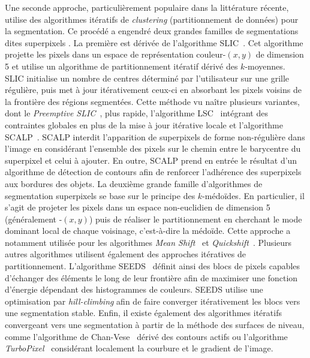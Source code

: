 Une seconde approche, particulièrement populaire dans la littérature récente, utilise des algorithmes itératifs de \emph{clustering} (partitionnement de données) pour la segmentation. Ce procédé a engendré deux grandes familles de segmentations dites \og superpixels \fg. La première est dérivée de l'algorithme \gls{SLIC}~\cite{achanta_slic_2010}. Cet algorithme projette les pixels dans un espace de représentation couleur-$(x,y)$ de dimension 5 et utilise un algorithme de partitionnement itératif dérivé des $k$-moyennes. \gls{SLIC} initialise un nombre de centres déterminé par l'utilisateur sur une grille régulière, puis met à jour itérativement ceux-ci en absorbant les pixels voisins de la frontière des régions segmentées. Cette méthode vu naître plusieurs variantes, dont le \emph{Preemptive SLIC}~\cite{neubert_compact_2014}, plus rapide, l'algorithme \gls{LSC}~\cite{li_superpixel_2015} intégrant des contraintes globales en plus de la mise à jour itérative locale et l'algorithme \gls{SCALP}~\cite{giraud_robust_2018}. \gls{SCALP} interdit l'apparition de superpixels de forme non-régulière dans l'image en considérant l'ensemble des pixels sur le chemin entre le barycentre du superpixel et celui à ajouter. En outre, \gls{SCALP} prend en entrée le résultat d'un algorithme de détection de contours afin de renforcer l'adhérence des superpixels aux bordures des objets.
La deuxième grande famille d'algorithmes de segmentation superpixels se base sur le principe des $k$-médoïdes. En particulier, il s'agit de projeter les pixels dans un espace non-euclidien de dimension 5 (généralement -$(x,y)$) puis de réaliser le partitionnement en cherchant le mode dominant local de chaque voisinage, c'est-à-dire la médoïde. Cette approche a notamment utilisée pour les algorithmes \emph{Mean Shift}~\cite{comaniciu_mean_2002} et \emph{Quickshift}~\cite{vedaldi_quick_2008}.
Plusieurs autres algorithmes utilisent également des approches itératives de partitionnement. L'algorithme \gls{SEEDS}~\cite{van_den_bergh_seeds_2012} définit ainsi des blocs de pixels capables d'échanger des éléments le long de leur frontière afin de maximiser une fonction d'énergie dépendant des histogrammes de couleurs. \gls{SEEDS} utilise une optimisation par \emph{hill-climbing} afin de faire converger itérativement les blocs vers une segmentation stable. Enfin, il existe également des algorithmes itératifs convergeant vers une segmentation à partir de la méthode des surfaces de niveau, comme l'algorithme de Chan-Vese~\cite{chan_active_1999} dérivé des contours actifs ou l'algorithme \emph{TurboPixel}~\cite{levinshtein_turbopixels_2009} considérant localement la courbure et le gradient de l'image.

